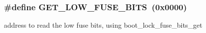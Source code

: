 \subsubsection[{\texorpdfstring{G\+E\+T\+\_\+\+L\+O\+W\+\_\+\+F\+U\+S\+E\+\_\+\+B\+I\+TS}{GET_LOW_FUSE_BITS}}]{\setlength{\rightskip}{0pt plus 5cm}\#define G\+E\+T\+\_\+\+L\+O\+W\+\_\+\+F\+U\+S\+E\+\_\+\+B\+I\+TS~(0x0000)}\hypertarget{group__avr__boot_gac68c37ecf2354ba2af6e08379d65899f}{}\label{group__avr__boot_gac68c37ecf2354ba2af6e08379d65899f}
address to read the low fuse bits, using boot\+\_\+lock\+\_\+fuse\+\_\+bits\+\_\+get 